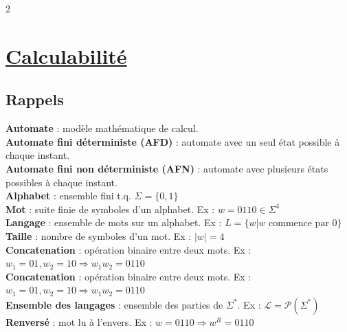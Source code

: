 \documentclass[11pt]{article}
\begin{document}
\begin{multicols}{2}
  \setlength{\columnseprule}{0.4pt}
  \section{\underline{Calculabilité}}
  \subsection{Rappels}
  \textbf{Automate} : modèle mathématique de calcul.\\
  \textbf{Automate fini déterministe (AFD)} : automate avec un seul état possible à chaque instant.\\
  \textbf{Automate fini non déterministe (AFN)} : automate avec plusieurs états possibles à chaque instant.\\
  \textbf{Alphabet} : ensemble fini t.q. $\Sigma=\{0,1\}$\\
  \textbf{Mot} : suite finie de symboles d'un alphabet. Ex : $w=0110 \in \Sigma^4$\\
  \textbf{Langage} : ensemble de mots sur un alphabet. Ex : $L=\{w | w \text{ commence par } 0\}$\\
  \textbf{Taille} : nombre de symboles d'un mot. Ex : $|w|=4$\\\textbf{Concatenation} : opération binaire entre deux mots. Ex : $w_1=01, w_2=10 \Rightarrow w_1w_2=0110$\\
  \textbf{Concatenation} : opération binaire entre deux mots. Ex : $w_1=01, w_2=10 \Rightarrow w_1w_2=0110$\\
  \textbf{Ensemble des langages} : ensemble des parties de $\Sigma^*$. Ex : $\mathcal{L}=\mathcal{P}(\Sigma^*)$\\
  \textbf{Renversé} : mot lu à l'envers. Ex : $w=0110 \Rightarrow w^R=0110$\\


\end{multicols}
\end{document}

